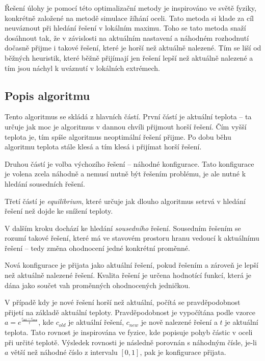 \documentclass[czech]{article}
\begin{document}
Řešení úlohy je pomocí této optimalizační metody je inspirováno ve světě fyziky, konkrétně založené na metodě simulace žíhání oceli.
Tato metoda si klade za cíl neuváznout při hledání řešení v lokálním maximu.
Toho se tato metoda snaží dosáhnout tak, že v závislosti na aktuálním nastavení a náhodném rozhodnutí dočasně přijme i takové řešení, které je horší než aktuálně nalezené.
Tím se liší od běžných heuristik, které běžně přijímají jen řešení lepší než aktuálně nalezené a tím jsou náchyl k uváznutí v lokálních extrémech.

\subsection{Popis algoritmu}

Tento algoritmus se skládá z hlavních částí.
První částí je aktuální teplota -- ta určuje jak moc je algoritmus v dannou chvíli  přijmout horší řešení.
Čím vyšší teplota je, tím spíše algoritmus neoptimální řešení přijme.
Po dobu běhu algoritmu teplota stále klesá a tím klesá i  přijímat horší řešení.

Druhou částí je volba výchozího řešení -- náhodné konfigurace.
Tato konfigurace je volena zcela náhodně a nemusí nutně být řešením problému, je ale nutné k hledání sousedních řešení.

Třetí částí je \textit{equilibrium}, které určuje jak dlouho algoritmus setrvá v hledání řešení než dojde ke snížení teploty.

V dalším kroku dochází ke hledání \textit{sousedního} řešení.
Sousedním řešením se rozumí takové řešení, které má ve stavovém prostoru hranu vedoucí k aktuálnímu řešení -- tedy změna ohodnocení jedné konkrétní proměnné.

Nová konfigurace je přijata jako aktuální řešení, pokud řešením a zároveň je lepší než aktuálně nalezené řešení.
Kvalita řešení je určena hodnotící funkcí, která je dána jako součet vah proměnných ohodnocených jedničkou.

V případě kdy je nové řešení horší než aktuální, počítá se pravděpodobnost přijetí na základě aktuální teploty.
Pravděpodobnost je vypočítána podle vzorce $a = e^\frac{c_{old} - c_{new}}{t}$, kde $c_{old}$ je aktuální řešení, $c_{new}$ je nově nalezené řešení a $t$ je aktuální teplota.
Tato rovnost je inspirována ve fyzice, kde popisuje pohyb částic v oceli při určité teplotě.
Výsledek rovnosti je následně porovnán s náhodným čísle, je-li $a$ větší než náhodné číslo z intervalu $[0, 1]$, pak je konfigurace přijata.
\end{document}
